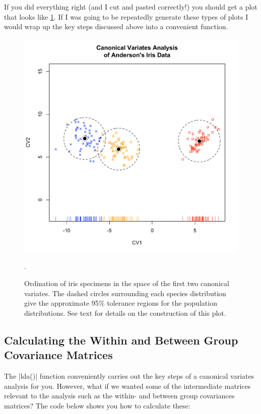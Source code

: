 If you did everything right (and I cut and pasted correctly!) you should get a plot that looks like \cref{fig:cva}.  If I was going to be repeatedly generate these types of plots I would wrap up the key steps discussed above into a convenient function.


\begin{figure}
\begin{center}
\includegraphics[height=0.5\columnwidth]{./figures/hands-on7/iris-cva-fancy}
\end{center}
\caption{Ordination of iris specimens in the space of the first two canonical variates.  The dashed circles surrounding each species distribution give the approximate 95\% tolerance regions for the population distributions. See text for details on the construction of this plot.} \label{fig:cva}.
\end{figure} 

\subsection{Calculating the Within and Between Group Covariance Matrices}

The |lda()| function conveniently carries out the key steps of a canonical variates analysis for you.  However, what if we wanted some of the intermediate matrices relevant to the analysis such as the within- and between group covariances matrices? The code below shows you how to calculate these:



